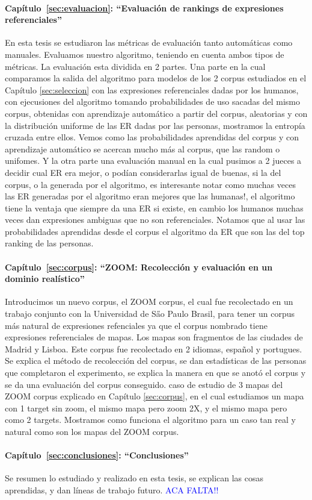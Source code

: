 \paragraph{Cap\'itulo~\ref{sec:evaluacion}: ``Evaluaci\'on de rankings de expresiones referenciales''} En esta tesis se estudiaron las m\'etricas de evaluaci\'on tanto autom\'aticas como manuales. Evaluamos nuestro algoritmo, teniendo en cuenta ambos tipos de m\'etricas. La evaluaci\'on esta dividida en 2 partes. Una parte en la cual comparamos la salida del algoritmo para modelos de los 2 corpus estudiados en el Cap\'itulo \ref{sec:seleccion} con las expresiones referenciales dadas por los humanos, con ejecusiones del algoritmo tomando probabilidades de uso sacadas del mismo corpus, obtenidas con aprendizaje autom\'atico a partir del corpus, aleatorias y con la distribuci\'on uniforme de las ER dadas por las personas, mostramos la entrop\'ia cruzada entre ellos. Vemos como las probabilidades aprendidas del corpus y con aprendizaje autom\'atico se acercan mucho m\'as al corpus, que las random o unifomes. Y la otra parte una evaluaci\'on manual en la cual pusimos a 2 jueces a decidir cual ER era mejor, o pod\'ian considerarlas igual de buenas, si la del corpus, o la generada por el algoritmo, es interesante notar como muchas veces las ER generadas por el algoritmo eran mejores que las humanas!, el algoritmo tiene la ventaja que siempre da una ER si existe, en cambio los humanos muchas veces dan expresiones ambiguas que no son referenciales. Notamos que al usar las probabilidades aprendidas desde el corpus el algoritmo da ER que son las del top ranking de las personas.

\paragraph{Cap\'itulo~\ref{sec:corpus}: ``ZOOM: Recolecci\'on y evaluaci\'on en un dominio real\'istico''} Introducimos un nuevo corpus, el ZOOM corpus, el cual fue recolectado en un trabajo conjunto con la Universidad de S\H ao Paulo Brasil, para tener un corpus m\'as natural de expresiones refenciales ya que el corpus nombrado tiene expresiones referenciales de mapas. Los mapas son fragmentos de las ciudades de Madrid y Lisboa. Este corpus fue recolectado en 2 idiomas, espa\~nol y portugues. Se explica el m\'etodo de recolecci\'on del corpus, se dan estad\'isticas de las personas que completaron el experimento, se explica la manera en que se anot\'o el corpus y se da una evaluaci\'on del corpus conseguido. caso de estudio de 3 mapas del ZOOM corpus explicado en Cap\'itulo \ref{sec:corpus}, en el cual estudiamos un mapa con 1 target sin zoom, el mismo mapa pero zoom 2X, y el mismo mapa pero como 2 targets. Mostramos como funciona el algoritmo para un caso tan real y natural como son los mapas del ZOOM corpus. 


\paragraph{Cap\'itulo~\ref{sec:conclusiones}: ``Conclusiones''} Se resumen lo estudiado y realizado en esta tesis, se explican las cosas aprendidas, y dan l\'ineas de trabajo futuro. \textcolor{blue}{ACA FALTA!! }

